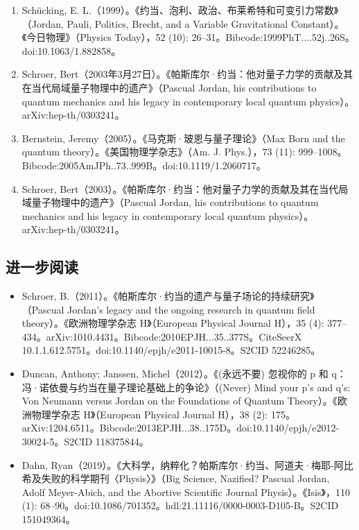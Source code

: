 \begin{enumerate}
\item Schücking, E. L.（1999）。《约当、泡利、政治、布莱希特和可变引力常数》（Jordan, Pauli, Politics, Brecht, and a Variable Gravitational Constant）。《今日物理》（Physics Today），52 (10): 26–31。Bibcode:1999PhT....52j..26S。doi:10.1063/1.882858。
\item Schroer, Bert（2003年3月27日）。《帕斯库尔·约当：他对量子力学的贡献及其在当代局域量子物理中的遗产》（Pascual Jordan, his contributions to quantum mechanics and his legacy in contemporary local quantum physics）。arXiv:hep-th/0303241。
\item Bernstein, Jeremy（2005）。《马克斯·玻恩与量子理论》（Max Born and the quantum theory）。《美国物理学杂志》（Am. J. Phys.），73 (11): 999–1008。Bibcode:2005AmJPh..73..999B。doi:10.1119/1.2060717。
\item Schroer, Bert（2003）。《帕斯库尔·约当：他对量子力学的贡献及其在当代局域量子物理中的遗产》（Pascual Jordan, his contributions to quantum mechanics and his legacy in contemporary local quantum physics）。arXiv:hep-th/0303241。
\end{enumerate}
\subsection{进一步阅读}
\begin{itemize}
\item Schroer, B.（2011）。《帕斯库尔·约当的遗产与量子场论的持续研究》（Pascual Jordan's legacy and the ongoing research in quantum field theory）。《欧洲物理学杂志 H》（European Physical Journal H），35 (4): 377–434。arXiv:1010.4431。Bibcode:2010EPJH...35..377S。CiteSeerX 10.1.1.612.5751。doi:10.1140/epjh/e2011-10015-8。S2CID 52246285。
\item Duncan, Anthony; Janssen, Michel（2012）。《(永远不要) 忽视你的 p 和 q：冯·诺依曼与约当在量子理论基础上的争论》（(Never) Mind your p's and q's: Von Neumann versus Jordan on the Foundations of Quantum Theory）。《欧洲物理学杂志 H》（European Physical Journal H），38 (2): 175。arXiv:1204.6511。Bibcode:2013EPJH...38..175D。doi:10.1140/epjh/e2012-30024-5。S2CID 118375844。
\item Dahn, Ryan（2019）。《大科学，纳粹化？帕斯库尔·约当、阿道夫·梅耶-阿比希及失败的科学期刊〈Physis〉》（Big Science, Nazified? Pascual Jordan, Adolf Meyer-Abich, and the Abortive Scientific Journal Physis）。《Isis》，110 (1): 68–90。doi:10.1086/701352。hdl:21.11116/0000-0003-D105-B。S2CID 151049364。
\end{itemize}